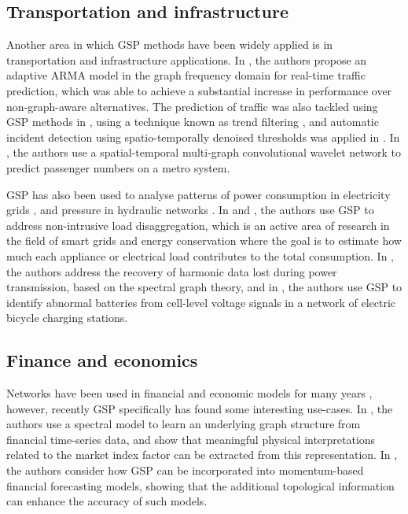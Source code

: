 \subsection{Transportation and infrastructure}

Another area in which GSP methods have been widely applied is in transportation and infrastructure applications. In \cite{Hasanzadeh2017}, the authors propose an adaptive ARMA model in the graph frequency domain for real-time traffic prediction, which was able to achieve a substantial increase in performance over non-graph-aware alternatives. The prediction of traffic was also tackled using GSP methods in \cite{Chakraborty2017}, using a technique known as trend filtering \citep{Wang2016}, and automatic incident detection using spatio-temporally denoised thresholds was applied in \citep{Chakraborty2019}. In \cite{Xiu2022}, the authors use a spatial-temporal multi-graph convolutional wavelet network to predict passenger numbers on a metro system. 

GSP has also been used to analyse patterns of power consumption in electricity grids \citep{Ramakrishna2021}, and pressure in hydraulic networks \citep{Zhou2022}. In \cite{He2018} and \cite{Zheng2022}, the authors use GSP to address non-intrusive load disaggregation, which is an active area of research in the field of smart grids and energy conservation where the goal is to estimate how much each appliance or electrical load contributes to the total consumption. In \cite{Ying2022}, the authors address the recovery of harmonic data lost during power transmission, based on the spectral graph theory, and in \cite{Wang2022b}, the authors use GSP to identify abnormal batteries from cell-level voltage signals in a network of electric bicycle charging stations. 


\subsection{Finance and economics}

Networks have been used in financial and economic models for many years \citep{Marti2021}, however, recently GSP specifically has found some interesting use-cases. In \cite{Vinicius2020}, the authors use a spectral model to learn an underlying graph structure from financial time-series data, and show that meaningful physical interpretations related to the market index factor can be extracted from this representation. In \citep{Zhang2023}, the authors consider how GSP can be incorporated into momentum-based financial forecasting models, showing that the additional topological information can enhance the accuracy of such models. 

